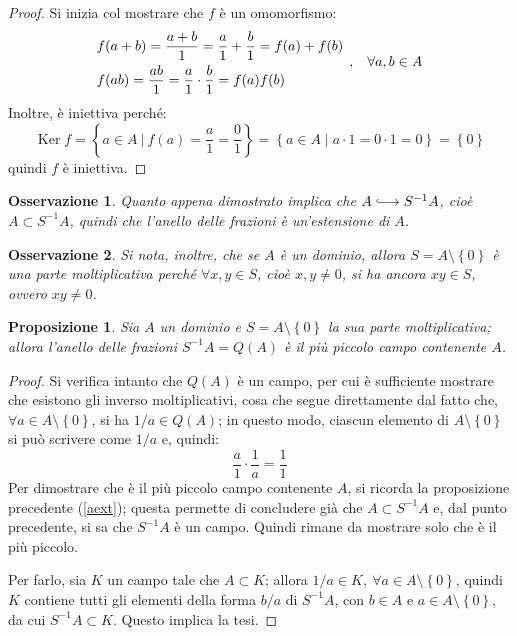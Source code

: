 \documentclass[12pt]{scrartcl}
\theoremstyle{style}
\newtheorem{prop}{Proposizione}[section]
\newtheorem{osservazione}{Osservazione}[section]
\numberwithin{equation}{subsection}
\newcommand{\longhookrightarrow}{\lhook\joinrel\longrightarrow}
\begin{document}
	\begin{proof}
		Si inizia col mostrare che $f$ \`e un omomorfismo:
		\[
			\begin{split}
				&f(a + b) = \frac{a+b}{1} = \frac{a}{1}+\frac{b}{1} = f(a) + f(b) \\
				&f(ab)  = \frac{ab}{1} = \frac{a}{1} \cdot \frac{b}{1} = f(a) f(b)
			\end{split} \hspace{.15cm} , \hspace{.3cm} \forall a,b \in A
		\] 
	Inoltre, \`e iniettiva perch\'e:
	\[
	\operatorname{Ker} f = \left\{ a \in  A \ \Big\lvert \ f(a) = \frac{a}{1} = \frac{0}{1} \right\} = \left\{ a \in A  \mid a \cdot 1 = 0\cdot 1 = 0 \right\} = \left\{ 0 \right\} 
	\] 
	quindi $f$ \`e iniettiva.
	\end{proof}
\begin{osservazione}
Quanto appena dimostrato implica che $A \longhookrightarrow  S^{-1}A$, cio\`e $A \subset S^{-1}A$, quindi che l'anello delle frazioni \`e un'estensione di $A$.
\end{osservazione}
\begin{osservazione}
Si nota, inoltre, che se $A$ \`e un dominio, allora $S = A \setminus\left\{ 0 \right\} $ \`e una parte moltiplicativa perch\'e $\forall x,y \in S$, cio\`e $x,y\neq 0$, si ha ancora $xy \in S$, ovvero $xy \neq 0$.
\end{osservazione}
\begin{prop}
	Sia $A$ un dominio e $S = A \setminus\left\{ 0 \right\} $ la sua parte moltiplicativa; allora l'anello delle frazioni $S^{-1}A=Q(A)$ \`e il pi\`u piccolo campo contenente $A$.
\end{prop}
	\begin{proof}
		Si verifica intanto che $Q(A)$ \`e un campo, per cui \`e sufficiente mostrare che esistono gli inverso moltiplicativi, cosa che segue direttamente dal fatto che, $\forall a \in A \setminus \left\{ 0 \right\} $, si ha $1 / a \in Q(A)$; in questo modo, ciascun elemento di $A\setminus\left\{ 0 \right\} $ si pu\`o scrivere come $1 / a$ e, quindi:
		\[
		\frac{a}{1}\cdot \frac{1}{a} = \frac{1}{1}
		\] 
		Per dimostrare che \`e il pi\`u piccolo campo contenente $A$, si ricorda la proposizione precedente (\ref{aext}); questa permette di concludere gi\`a che $A \subset S^{-1}A$ e, dal punto precedente, si sa che $S^{-1}A$ \`e un campo.
		Quindi rimane da mostrare solo che \`e il pi\`u piccolo.

		Per farlo, sia $K$ un campo tale che $A \subset K$; allora $1 / a \in K , \ \forall a \in A \setminus\left\{ 0 \right\} $, quindi $K$ contiene tutti gli elementi della forma $b / a$ di $S^{-1}A$, con $b \in A$ e $a \in A \setminus\left\{ 0 \right\} $, da cui $S^{-1}A \subset K$.
		Questo implica la tesi.
	\end{proof}
\end{document}

